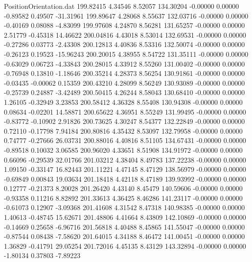\begin{filecontents}{PositionOrientation.dat}
 199.82415    4.34546    8.52057   134.30204   -0.00000    0.00000   -0.89582    0.49507  -31.31961
 199.89647    4.28068    8.55637   132.03716   -0.00000    0.00000   -0.40169    0.08088   -4.83099
 199.97608    4.24870    8.56281   131.65257   -0.00000    0.00000    2.51779   -0.45318   14.46622
 200.04816    4.43018    8.53014   132.69531   -0.00000    0.00000   -0.27286    0.03773   -2.43308
 200.12813    4.40836    8.53316   132.50074   -0.00000    0.00000   -0.26123    0.19523  -15.96243
 200.20015    4.38955    8.54722   131.35111   -0.00000    0.00000   -0.63029    0.06723   -4.33843
 200.28015    4.33912    8.55260   131.00402   -0.00000    0.00000   -0.76948    0.13810   -1.18646
 200.35214    4.28373    8.56254   130.91861   -0.00000    0.00000   -0.03435   -0.00062    0.15359
 200.43210    4.28099    8.56249   130.93089   -0.00000    0.00000   -0.25739    0.24887   -3.42489
 200.50415    4.26244    8.58043   130.68410   -0.00000    0.00000    1.26105   -0.32949    3.23853
 200.58412    4.36328    8.55408   130.94308   -0.00000    0.00000    0.08634   -0.02201   14.58871
 200.65622    4.36951    8.55249   131.99495   -0.00000    0.00000   -0.83772   -0.10902    2.91826
 200.73625    4.30247    8.54377   132.22849   -0.00000    0.00000    0.72110   -0.17798    7.94184
 200.80816    4.35432    8.53097   132.79958   -0.00000    0.00000    0.74777   -0.27666   26.03731
 200.88016    4.40816    8.51105   134.67431   -0.00000    0.00000   -0.89518    0.10032    3.06585
 200.96020    4.33651    8.51908   134.91972   -0.00000    0.00000    0.66096   -0.29539   32.01766
 201.03212    4.38404    8.49783   137.22238   -0.00000    0.00000    1.09150   -0.33147   16.82443
 201.11221    4.47145    8.47129   138.56979   -0.00000    0.00000   -0.69849    0.00843   19.03634
 201.18418    4.42118    8.47189   139.93992   -0.00000    0.00000    0.12777   -0.21373    8.20028
 201.26420    4.43140    8.45479   140.59606   -0.00000    0.00000   -0.93358    0.11216    8.82892
 201.33613    4.36425    8.46286   141.23117   -0.00000    0.00000   -0.61073    0.12907   -3.09368
 201.41608    4.31542    8.47318   140.98385   -0.00000    0.00000    1.40613   -0.48745   15.62671
 201.48806    4.41664    8.43809   142.10869   -0.00000    0.00000   -0.14669    0.25658   -6.96716
 201.56818    4.40488    8.45865   141.55047   -0.00000    0.00000   -0.87544    0.08438   -7.58620
 201.64015    4.34188    8.46472   141.00451   -0.00000    0.00000    1.36829   -0.41791   29.05254
 201.72016    4.45135    8.43129   143.32894   -0.00000    0.00000   -1.80134    0.37803   -7.89223

\end{filecontents}
